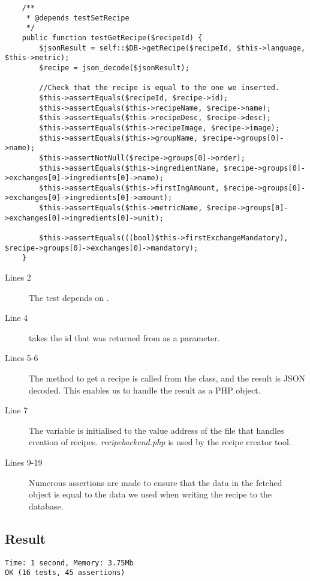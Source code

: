 \begin{lstlisting}
    /**
     * @depends testSetRecipe
     */
    public function testGetRecipe($recipeId) {
        $jsonResult = self::$DB->getRecipe($recipeId, $this->language, $this->metric);
        $recipe = json_decode($jsonResult);

        //Check that the recipe is equal to the one we inserted.
        $this->assertEquals($recipeId, $recipe->id);
        $this->assertEquals($this->recipeName, $recipe->name);
        $this->assertEquals($this->recipeDesc, $recipe->desc);
        $this->assertEquals($this->recipeImage, $recipe->image);
        $this->assertEquals($this->groupName, $recipe->groups[0]->name);
        $this->assertNotNull($recipe->groups[0]->order);
        $this->assertEquals($this->ingredientName, $recipe->groups[0]->exchanges[0]->ingredients[0]->name);
        $this->assertEquals($this->firstIngAmount, $recipe->groups[0]->exchanges[0]->ingredients[0]->amount);
        $this->assertEquals($this->metricName, $recipe->groups[0]->exchanges[0]->ingredients[0]->unit);

        $this->assertEquals(((bool)$this->firstExchangeMandatory), $recipe->groups[0]->exchanges[0]->mandatory);
    }
\end{lstlisting}%

\begin{description}
\item[Lines 2] The test depends on .
\item[Line 4]  takes the id that was returned from  as a parameter.
\item[Lines 5-6] The method to get a recipe is called from the  class, and the result is JSON decoded. This enables us to handle the result as a PHP object.
\item[Line 7] The  variable is initialised to the value address of the file that handles creation of recipes. \textit{recipebackend.php} is used by the recipe creator tool.%
\item[Lines 9-19] Numerous assertions are made to ensure that the data in the fetched object is equal to the data we used when writing the recipe to the database.
\end{description}

\subsection*{Result}
\begin{lstlisting}[numbers=none, basicstyle=\ttfamily, caption={The result of the PHPUnit test}]
Time: 1 second, Memory: 3.75Mb
OK (16 tests, 45 assertions)
\end{lstlisting}

